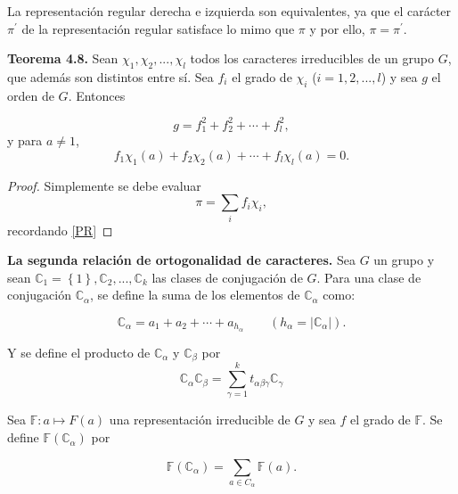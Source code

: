 \documentclass[12pt]{book}
\theoremstyle{definition}
\newcounter{in}
\begin{document}
La representación regular derecha e izquierda son equivalentes, ya que
el carácter $\pi^{'}$ de la representación regular satisface lo mimo
que $\pi$ y por ello, $\pi = \pi^{'}$.

\textbf{Teorema 4.8.} Sean $\chi_{1}, \chi_{2},...,\chi_{l} $ todos
los caracteres irreducibles de un grupo $G$, que además son distintos
entre sí. Sea $f_{i}$ el grado de $\chi_{i}$ ($i=1, 2,..., l$) y sea
$g$ el orden de $G$. Entonces

\begin{equation*}
  g=f_{1}^{2}+f_{2}^{2}+ \cdots + f_{l}^{2},
\end{equation*}
y para $a \neq 1$,
\begin{equation*}
  f_{1} \chi_{1}(a)+f_{2} \chi_{2}(a)+ \cdots + f_{l} \chi_{l}(a) = 0.
\end{equation*}

\begin{proof}
  Simplemente se debe evaluar
  \begin{equation*}
   \pi=\sum_{i} f_{i} \chi_{i},
 \end{equation*}
 recordando \eqref{PR}
\end{proof}

\textbf{La segunda relación de ortogonalidad de caracteres.} Sea $G$
un grupo y sean
$\mathbb{C}_{1}=\left\{1 \right\}, \mathbb{C}_{2},...,\mathbb{C}_{k}$
las clases de conjugación de $G$. Para una clase de conjugación
$\mathbb{C}_{\alpha}$, se define la suma de los elementos de
$\mathbb{C}_{\alpha}$ como:

\begin{equation*}
  \mathbb{C}_{\alpha}=a_{1}+a_{2}+ \cdots + a_{h_{\alpha}} \qquad (h_{\alpha}=|\mathbb{C}_{\alpha}|).
\end{equation*}

Y se define el producto de $\mathbb{C}_{\alpha}$ y $\mathbb{C}_{\beta}$ por
\begin{equation*} \label{MULT}
  \mathbb{C}_{\alpha} \mathbb{C}_{\beta} = \sum_{\gamma=1}^{k} t_{\alpha \beta \gamma} \mathbb{C}_{\gamma}
\end{equation*}

Sea $\mathbb{F} \colon a \mapsto F(a)$ una representación irreducible
de $G$ y sea $f$ el grado de $\mathbb{F}$. Se define
$\mathbb{F} (\mathbb{C}_{\alpha})$ por

\begin{equation*}
  \mathbb{F} (\mathbb{C}_{\alpha}) = \sum_{a \in C_{\alpha}} \mathbb{F}(a).
\end{equation*}
\end{document}
